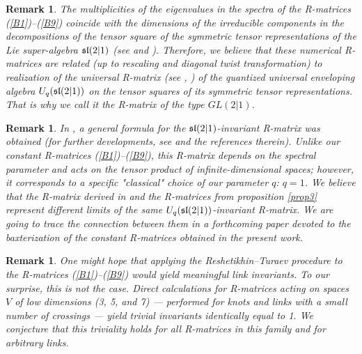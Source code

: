 \documentclass[11pt]{article}
\newcounter{theorem}\def\thetheorem{\thesection.\arabic{theorem}}\makeatletter
\newtheorem{rem}[theorem]{Remark}
\begin{document}
\begin{rem}{\rm
		The multiplicities of the eigenvalues in the spectra of the R-matrices   (\ref{B1})--(\ref{B9}) coincide with the dimensions of the irreducible components in the decompositions of the tensor square of the symmetric tensor representations of the Lie super-algebra $\frak{sl}(2|1)$ (see \cite{BR} and \cite{GQS}).  
		Therefore, we believe that these numerical R-matrices  are  related (up to rescaling and diagonal twist transformation) to realization of the universal R-matrix (see \cite{KT}, \cite{Y}) of the quantized universal enveloping algebra $U_q(\frak{sl}(2|1))$ on the tensor squares of its symmetric tensor representations. That is why we call it the R-matrix of the type $GL(2|1)$.
	}
\end{rem}
\begin{rem}{\rm
In \cite{DKK}, a general formula for the $\frak{sl}(2\vert1)$-invariant R-matrix was obtained (for further developments, see \cite{DG} and the references therein).
Unlike our constant R-matrices (\ref{B1})--(\ref{B9}),  
 this R-matrix depends on the spectral parameter and acts on the tensor product of infinite-dimensional spaces; however, it corresponds to a specific "classical" choice of our parameter $q$: $q=1$. 
We believe that the R-matrix derived in \cite{DKK} and the R-matrices from proposition \ref{prop3}	represent different limits of the same $U_q(\frak{sl}(2\vert1))$-invariant R-matrix. We are going to trace the connection between them in a forthcoming paper devoted to the baxterization of the constant R-matrices obtained in the present work.
}
\end{rem}
 
\begin{rem}{\rm
	One might hope that applying the Reshetikhin–Turaev procedure \cite{RT,RT2} to the R-matrices (\ref{B1})–(\ref{B9}) would yield meaningful link invariants.
	To our surprise, this is not the case.
	Direct calculations for R-matrices acting on spaces $V$ of low dimensions (3, 5, and 7) --- performed for knots and links with a small number of crossings --- yield trivial invariants identically equal to 1.
	We conjecture that this triviality holds for all R-matrices in this family and for arbitrary links.
		}
\end{rem}
\end{document}
